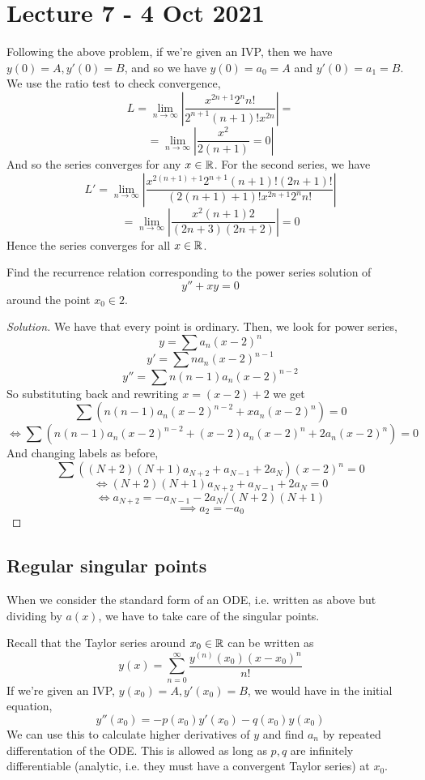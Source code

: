 \section{Lecture 7 - 4 Oct 2021}
Following the above problem, if we're given an IVP, then we have $y(0)=A,y'(0)=B$, and so
we have $y(0)=a_0=A$ and $y'(0)=a_1=B$. We use the ratio test to check convergence,
\[L = \lim_{n\to\infty} |\frac{x^{2n+1}2^n n!}{2^{n+1}(n+1)!x^{2n}}|= \]
\[=\lim_{n\to\infty} |\frac{x^2}{2(n+1)}=0|\]
And so the series converges for any $x\in\mathbb R$. For the second series, we have
\[L'=\lim_{n\to\infty} |\frac{x^{2(n+1)+1}2^{n+1}(n+1)! (2n+1)!}{(2(n+1)+1)! x^{2n+1}2^n n!}|\]
\[= \lim_{n\to\infty} |\frac{x^2 (n+1)2}{(2n+3)(2n+2)}|=0\]
Hence the series converges for all $x\in\mathbb R$.


\begin{example}
  Find the recurrence relation corresponding to the power series solution of
  \[y''+xy=0\]
  around the point $x_0\in 2$.
\end{example}
\begin{proof}[Solution]
  We have that every point is ordinary. Then, we look for power series,
  \[y=\sum a_n (x-2)^n\]
  \[y'=\sum na_n (x-2)^{n-1}\]
  \[y''=\sum n(n-1)a_n (x-2)^{n-2}\]
  So substituting back and rewriting $x=(x-2)+2$ we get
  \[\sum ( n(n-1)a_n (x-2)^{n-2} + xa_n(x-2)^n )= 0\]
  \[\iff \sum ( n(n-1)a_n (x-2)^{n-2} + (x-2)a_n(x-2)^n + 2a_n(x-2)^n )= 0\]
  And changing labels as before,
  \[\sum ( (N+2)(N+1)a_{N+2} + a_{N-1} + 2a_N )(x-2)^n= 0\]
  \[\iff (N+2)(N+1)a_{N+2} + a_{N-1} + 2a_N =0 \]
  \[\iff a_{N+2} = - a_{N-1} - 2a_N /(N+2)(N+1) \]
  \[\implies a_2 = -a_0\]

\end{proof}

\subsection{Regular singular points}
When we consider the standard form of an ODE, i.e. written as above but dividing by
$a(x)$, we have to take care of the singular points.

Recall that the Taylor series around $x_0\in\mathbb R$ can be written as 
\[y(x)= \sum_{n=0}^{\infty} \frac{y^{(n)}(x_0) (x-x_0)^n}{n!}\]
If we're given an IVP, $y(x_0)=A, y'(x_0)=B$, we would have in the initial equation,
\[y''(x_0) = -p(x_0) y'(x_0) - q(x_0) y(x_0)\]
We can use this to calculate higher derivatives of $y$ and find $a_n$ by repeated
differentation of the ODE. This is allowed as long as $p,q$ are infinitely differentiable
(analytic, i.e. they must have a convergent Taylor series) at $x_0$. 


